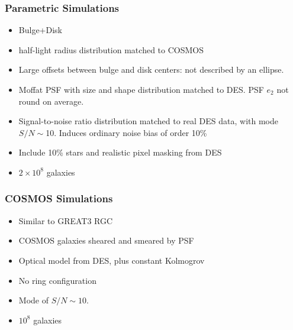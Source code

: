 \documentclass{beamer}
\begin{document}
\frame
{
    \frametitle{Parametric Simulations}

 
    \begin{itemize}

        \item {\color{gold} Bulge+Disk}

        \item half-light radius distribution matched to COSMOS

        \item Large offsets between bulge and disk centers:
            {\color{green} not described by an ellipse}.

        \item Moffat PSF with size and shape distribution
            matched to DES.  PSF $e_2$ not round on average.

        \item Signal-to-noise ratio distribution matched to real DES
            data, with {\color{lightskyblue} mode $S/N \sim$10}.  Induces ordinary noise
            bias of order 10\%
        
        \item Include 10\% {\color{brightred} stars} and realistic pixel
            {\color{orange} masking} from DES

        \item $2 \times 10^8$ galaxies


    \end{itemize}

}

\frame
{
    \frametitle{COSMOS Simulations}

 
    \begin{itemize}
        \item Similar to {\color{lightskyblue} GREAT3 RGC}

        \item COSMOS galaxies sheared and smeared by PSF

        \item Optical model from DES, plus constant Kolmogrov
        \item {\color{gold} No ring} configuration
        \item Mode of {\color{orange} $S/N \sim 10$}.
        \item $10^8$ galaxies
    \end{itemize}

}
\end{document}
